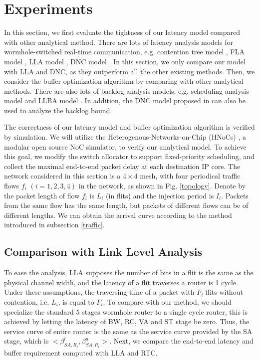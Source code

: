\documentclass[10pt,journal]{IEEEtran}
\begin{document}
\section{Experiments}\label{experiments}
In this section, we first evaluate the tightness of our latency model compared with other analytical method. There are lots of latency analysis models for wormhole-switched real-time communication, e.g. contention tree model \cite{LuJS05}, FLA model \cite{Shi:2008:RCA:1397757.1397996}, LLA model \cite{73}, DNC model \cite{Qian489900}. In this section, we only compare our model with LLA and DNC, as they outperform all the other existing methods. Then, we consider the buffer optimization algorithm by comparing with other analytical methods. There are also lots of backlog analysis models, e.g. scheduling analysis model \cite{Manolache:2006:BSO:1131481.1131683} and LLBA model \cite{189}. In addition, the DNC model proposed in \cite{Qian489900} can also be used to analyze the backlog bound.

The correctness of our latency model and buffer optimization algorithm is verified by simulation. We will utilize the Heterogenous-Networks-on-Chip (HNoCs) \cite{6404157}, a modular open source NoC simulator, to verify our analytical model. To achieve this goal, we modify the switch allocator to support fixed-priority scheduling, and collect the maximal end-to-end packet delay at each destination IP core. The network considered in this section is a $4\times 4$ mesh, with four periodical traffic flows $f_i$ $(i=1,2,3,4)$ in the network, as shown in Fig. \ref{topology}. Denote by the packet length of flow $f_i$ is $L_i$ (in flits) and the injection period is $I_i$. Packets from the same flow has the same length, but packets of different flows can be of different lengths. We can obtain the arrival curve according to the method introduced in subsection \ref{traffic}.

\subsection{Comparison with Link Level Analysis}
To ease the analysis, LLA supposes the number of bits in a flit is the same as the physical channel width, and the latency of a flit traverses a router is 1 cycle. Under these assumptions, the traversing time of a packet with $F_i$ flits without contention, i.e. $L_i$, is equal to $F_i$. To compare with our method, we should specialize the standard 5 stages wormhole router to a single cycle router, this is achieved by letting the latency of BW, RC, VA and ST stage be zero. Thus, the service curve of entire router is the same as the service curve provided by the SA stage, which is $<\beta_{SA,R_i}^l,\beta_{SA,R_i}^u>$. Next, we compare the end-to-end latency and buffer requirement computed with LLA and RTC.
\end{document}
